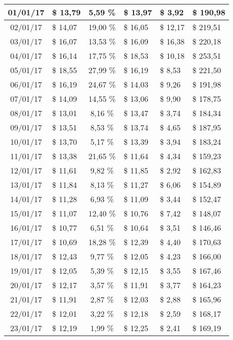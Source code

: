 \begin{center}
\begin{small}
\begin{longtable}{|c|l|c|l|l|l|}
01/01/17 & \$ 13,79 & 5,59 \% & \$ 13,97 & \$ 3,92 & \$ 190,98 \\ \hline
02/01/17 & \$ 14,07 & 19,00 \% & \$ 16,05 & \$ 12,17 & \$ 219,51 \\ \hline
03/01/17 & \$ 16,07 & 13,53 \% & \$ 16,09 & \$ 16,38 & \$ 220,18 \\ \hline
04/01/17 & \$ 16,14 & 17,75 \% & \$ 18,53 & \$ 10,18 & \$ 253,51 \\ \hline
05/01/17 & \$ 18,55 & 27,99 \% & \$ 16,19 & \$ 8,53 & \$ 221,50 \\ \hline
06/01/17 & \$ 16,19 & 24,67 \% & \$ 14,03 & \$ 9,26 & \$ 191,98 \\ \hline
07/01/17 & \$ 14,09 & 14,55 \% & \$ 13,06 & \$ 9,90 & \$ 178,75 \\ \hline
08/01/17 & \$ 13,01 & 8,16 \% & \$ 13,47 & \$ 3,74 & \$ 184,34 \\ \hline
09/01/17 & \$ 13,51 & 8,53 \% & \$ 13,74 & \$ 4,65 & \$ 187,95 \\ \hline
10/01/17 & \$ 13,70 & 5,17 \% & \$ 13,39 & \$ 3,94 & \$ 183,24 \\ \hline
11/01/17 & \$ 13,38 & 21,65 \% & \$ 11,64 & \$ 4,34 & \$ 159,23 \\ \hline
12/01/17 & \$ 11,61 & 9,82 \% & \$ 11,85 & \$ 2,92 & \$ 162,83 \\ \hline
13/01/17 & \$ 11,84 & 8,13 \% & \$ 11,27 & \$ 6,06 & \$ 154,89 \\ \hline
14/01/17 & \$ 11,28 & 6,93 \% & \$ 11,09 & \$ 3,44 & \$ 152,47 \\ \hline
15/01/17 & \$ 11,07 & 12,40 \% & \$ 10,76 & \$ 7,42 & \$ 148,07 \\ \hline
16/01/17 & \$ 10,77 & 6,51 \% & \$ 10,64 & \$ 3,51 & \$ 146,46 \\ \hline
17/01/17 & \$ 10,69 & 18,28 \% & \$ 12,39 & \$ 4,40 & \$ 170,63 \\ \hline
18/01/17 & \$ 12,43 & 9,77 \% & \$ 12,05 & \$ 4,23 & \$ 166,00 \\ \hline
19/01/17 & \$ 12,05 & 5,39 \% & \$ 12,15 & \$ 3,55 & \$ 167,46 \\ \hline
20/01/17 & \$ 12,17 & 3,57 \% & \$ 11,91 & \$ 3,77 & \$ 164,23 \\ \hline
21/01/17 & \$ 11,91 & 2,87 \% & \$ 12,03 & \$ 2,88 & \$ 165,96 \\ \hline
22/01/17 & \$ 12,01 & 3,22 \% & \$ 12,18 & \$ 2,59 & \$ 168,17 \\ \hline
23/01/17 & \$ 12,19 & 1,99 \% & \$ 12,25 & \$ 2,41 & \$ 169,19 \\ \hline

\end{longtable}
\end{small}
\end{center}
